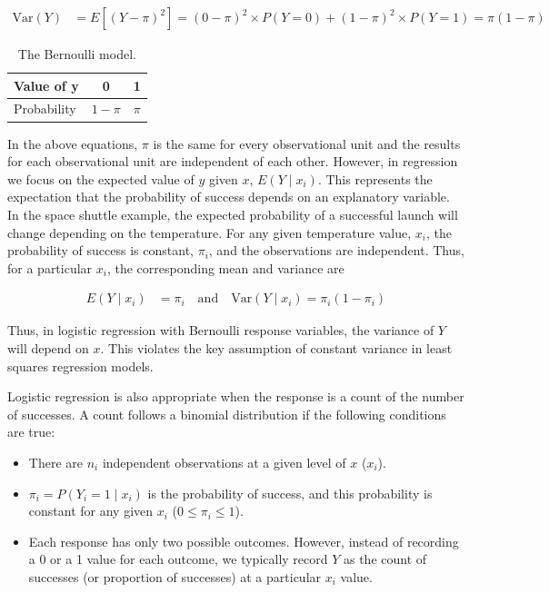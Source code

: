 \documentclass[
]{report}
\providecommand{\tightlist}{%
  \setlength{\itemsep}{0pt}\setlength{\parskip}{0pt}}
\begin{document}
\begin{align}
\mathrm{Var}(Y) &= E[(Y - \pi)^2] = (0 - \pi)^2 \times P(Y = 0) + (1 - \pi)^2 \times P(Y = 1) = \pi (1 - \pi) \tag{7.19}
\end{align}

\begin{table}[!h]
\centering
\caption{\label{tab:table2}The Bernoulli model.}
\centering
\begin{tabular}[t]{lcc}
\toprule
Value of y & 0 & 1\\
\midrule
Probability & $1 - \pi$ & $\pi$\\
\bottomrule
\end{tabular}
\end{table}

In the above equations, \(\pi\) is the same for every observational unit and the results for each observational unit are independent of each other. However, in regression we focus on the expected value of \(y\) given \(x\), \(E(Y \mid x_i)\). This represents the expectation that the probability of success depends on an explanatory variable. In the space shuttle example, the expected probability of a successful launch will change depending on the temperature. For any given temperature value, \(x_i\), the probability of success is constant, \(\pi_i\), and the observations are independent. Thus, for a particular \(x_i\), the corresponding mean and variance are

\begin{align}
E(Y \mid x_i) &= \pi_i \quad \text{and} \quad \mathrm{Var}(Y \mid x_i) = \pi_i (1 - \pi_i) 
\tag{7.20}
\end{align}

Thus, in logistic regression with Bernoulli response variables, the variance of \(Y\) will depend on \(x\). This violates
the key assumption of constant variance in least squares regression models.

Logistic regression is also appropriate when the response is a count of the number of successes. A count follows a binomial distribution if the following conditions are true:

\begin{itemize}
\tightlist
\item
  There are \(n_i\) independent observations at a given level of \(x\) (\(x_i\)).
\item
  \(\pi_i = P(Y_i = 1 \mid x_i)\) is the probability of success, and this probability is constant for any given \(x_i\) (\(0 \le \pi_i \le 1\)).
\item
  Each response has only two possible outcomes. However, instead of recording a 0 or a 1 value for each outcome, we typically record \(Y\) as the count of successes (or proportion of successes) at a particular \(x_i\) value.
\end{itemize}
\end{document}
